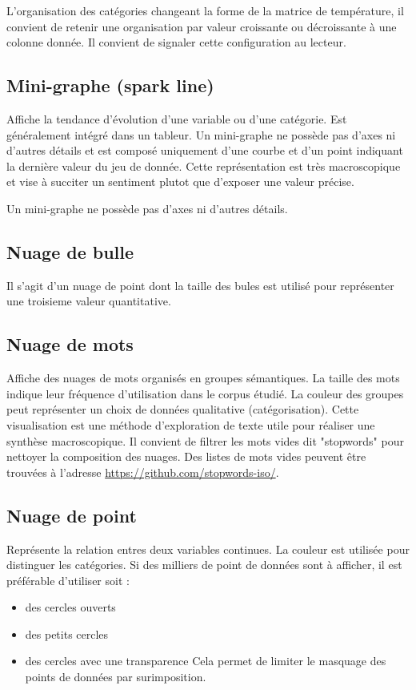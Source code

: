 \documentclass[a4paper,12pt]{article}
\begin{document}
\begin{multicols}{2}
L'organisation des catégories changeant la forme de la matrice de température, il convient de retenir une organisation par valeur croissante ou décroissante à une colonne donnée. Il convient de signaler cette configuration au lecteur. \autocite{wilkeVisualizingAmounts2019}
\subsection*{Mini-graphe (spark line)}
\label{sec:org87d840e}
Affiche la tendance d'évolution d'une variable ou d'une catégorie. Est généralement intégré dans un tableur. Un mini-graphe ne possède pas d'axes ni d'autres détails et est composé uniquement d'une courbe et d'un point indiquant la dernière valeur du jeu de donnée. \autocite{sosulskiGraphics2019} Cette représentation est très macroscopique et vise à succiter un sentiment plutot que d'exposer une valeur précise. \autocite{jonathanschwabishDistribution2021}

Un mini-graphe ne possède pas d'axes ni d'autres détails.
\subsection*{Nuage de bulle}
\label{sec:org9207f7f}
Il s'agit d'un nuage de point dont la taille des bules est utilisé pour représenter une troisieme valeur quantitative. \autocite{alansmithLexiqueVisuel}
\subsection*{Nuage de mots}
\label{sec:orgc7a8031}
Affiche des nuages de mots organisés en groupes sémantiques. La taille des mots indique leur fréquence d'utilisation dans le corpus étudié. La couleur des groupes peut représenter un choix de données qualitative (catégorisation). \autocite{sosulskiGraphics2019} Cette visualisation est une méthode d'exploration de texte utile pour réaliser une synthèse macroscopique.
Il convient de filtrer les mots vides dit "stopwords" pour nettoyer la composition des nuages. \autocite{jonathanschwabishQualitative2021} Des listes de mots vides peuvent être trouvées à l'adresse \url{https://github.com/stopwords-iso/}.
\subsection*{Nuage de point}
\label{sec:org31e87c8}
Représente la relation entres deux variables continues. \autocite{alansmithLexiqueVisuel}
La couleur est utilisée pour distinguer les catégories.
Si des milliers de point de données sont à afficher, il est préférable d'utiliser soit :
\begin{itemize}
\item des cercles ouverts
\item des petits cercles
\item des cercles avec une transparence
Cela permet de limiter le masquage des points de données par surimposition. \autocite{andreaskrauseBestPracticesData2024}
\end{itemize}

\end{multicols}
\end{document}
